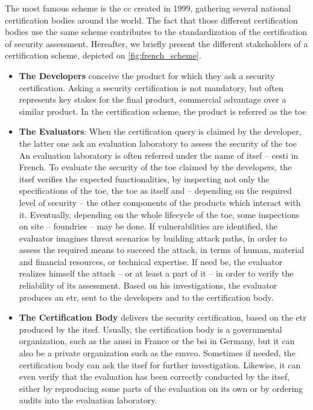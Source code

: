 The most famous scheme is the \gls{cc} created in 1999, gathering several national certification bodies around the world.
The fact that those different certification bodies use the same scheme contributes to the standardization of the certification of security assessment.
Hereafter, we briefly present the different stakeholders of a certification scheme, depicted on \autoref{fig:french_scheme}.
\begin{itemize}
	\item \textbf{The Developers}
	conceive the product for which they ask a security certification.
	Asking a security certification is not mandatory, but often represents key stakes for the final product, \eg{} commercial advantage over a similar product.
	In the certification scheme, the product is referred as the \gls{toe}
	\item \textbf{The Evaluators}:
	When the certification query is claimed by the developer, the latter one ask an evaluation laboratory to assess the security of the \gls{toe}
	An evaluation laboratory is often referred under the name of \gls{itsef} -- \gls{cesti} in French.
	To evaluate the security of the \gls{toe} claimed by the developers, the \gls{itsef} verifies the expected functionalities, by inspecting not only the specifications of the \gls{toe}, the \gls{toe} as itself and -- depending on the required level of security -- the other components of the products which interact with it.
	Eventually, depending on the whole lifecycle of the \gls{toe}, some inspections on site -- \eg{} foundries -- may be done.
	If vulnerabilities are identified, the evaluator imagines threat scenarios by building attack paths, in order to assess the required means to succeed the attack, in terms of human, material and financial resources, or technical expertise.
	If need be, the evaluator realizes himself the attack -- or at least a part of it -- in order to verify the reliability of its assessment.
	Based on his investigations, the evaluator produces an \gls{etr}, sent to the developers and to the certification body.
	\item \textbf{The Certification Body}
	delivers the security certification, based on the \gls{etr} produced by the \gls{itsef}.
	Usually, the certification body is a governmental organization, such as the \gls{anssi} in France or the \gls{bsi} in Germany, but it can also be a private organization such as the \gls{emvco}.
	Sometimes if needed, the certification body can ask the \gls{itsef} for further investigation.
	Likewise, it can even verify that the evaluation has been correctly conducted by the \gls{itsef}, either by reproducing some parts of the evaluation on its own or by ordering audits into the evaluation laboratory. 

\end{itemize}
